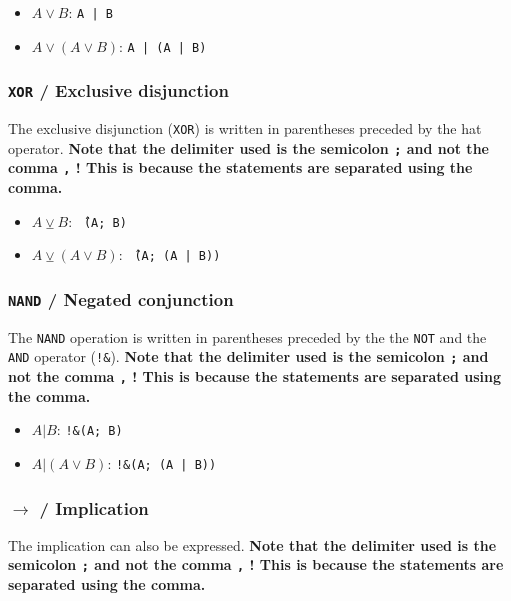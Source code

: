\documentclass[a4paper]{article}
\begin{document}
\begin{itemize}
    \item $A \lor B$:  \texttt{A | B}
    \item $A \lor (A \lor B)$: \texttt{A | (A | B)}
\end{itemize}

\subsubsection{\texttt{XOR} /  Exclusive disjunction}

The exclusive disjunction (\texttt{XOR}) is written in parentheses preceded by the hat operator. \textbf{Note that the delimiter used is the semicolon \texttt{;} and not the comma \texttt{,} ! This is because the statements are separated using the comma.}

\begin{itemize}
    \item $A \veebar B$:  \texttt{\^\ (A; B)}
    \item $A \veebar (A \lor B)$: \texttt{\^\ (A; (A | B))}
\end{itemize}

\subsubsection{\texttt{NAND} / Negated conjunction}

The \texttt{NAND} operation is written in parentheses preceded by the the \texttt{NOT} and the \texttt{AND} operator (\texttt{!\&}). \textbf{Note that the delimiter used is the semicolon \texttt{;} and not the comma \texttt{,} ! This is because the statements are separated using the comma.}

\begin{itemize}
    \item $A | B$:  \texttt{!\&(A; B)}
    \item $A | (A \lor B)$: \texttt{!\&(A; (A | B))}
\end{itemize}

\subsubsection{\texorpdfstring{$\rightarrow$ / }{}Implication}

The implication can also be expressed. \textbf{Note that the delimiter used is the semicolon \texttt{;} and not the comma \texttt{,} ! This is because the statements are separated using the comma.}
\end{document}
